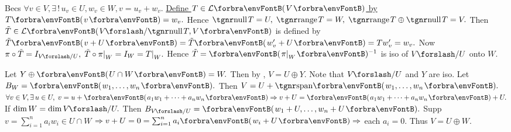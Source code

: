 \BulletPointX\NoteFor{[3.88, 3.90, 3.91]}\;\TextB{}
{Becs $\forall v\in V,\exists\,!\,u_v\in U,w_v\in W,v=u_v+w_v.$ \uline{Define $T\in\Lm{V}$ by $T\Par{v}=w_v.$}}\vspace{1pt}\TextB{}
{Hence $\null T=U,\;\range T=W,\;\range T\oplus\null T=V.$}\vspace{1pt}\TextB{}
{Then $\tilde{T}\in\Lm{V\XSlash \null T,V}$ is defined by $\tilde{T}\Par{v+U}=\tilde{T}\Par{w_v'+U}=Tw_v'=w_v.$ \FontSmall{}}\vspace{1pt}\TextB{}
{Now $\pi\circ\tilde{T}=I_{V\XSlash U},\;\tilde{T}\circ\pi\mmid_W=I_{W}=T\mmid_W.$ \;Hence $\tilde{T}=\Par{\pi\mmid_W}{^{-1}}$ is iso of $V\XSlash U$ onto $W.$}\par\vspace{3pt}
\SepLine

Let $Y\oplus\Par{U\cap W}=W.$ Then by , $V=U\oplus Y.$ Note that $V\XSlash U$ and $Y$ are iso.\PfEnd\parSol{\vspace{2pt}}
\Or Let $B_W=\Par{w_1,\dots,w_n}.$ Then $V=U+\Span{w_1,\dots,w_n}.$\parSol{}
$\forall v\in V,\exists\,u\in U,\;v=u+\Par{a_1w_1+\dots+a_nw_n}\Rightarrow v+U=\Par{a_1w_1+\dots+a_nw_n}+U.$\PfEnd\vspace{2pt}
\ANote If $\dim W=\dim V\XSlash U.$ Then $B_{V\XSlash U}=\Par{w_1+U,\dots,w_n+U}.$ Supp $v=\sum_{i=1}^na_iw_i\in U\cap W$\parNot
$\Rightarrow v+U=0=\sum_{i=1}^na_i\Par{w_i+U}\Rightarrow$ each $a_i=0.$ Thus $V=U\oplus W.$
\SepLine

